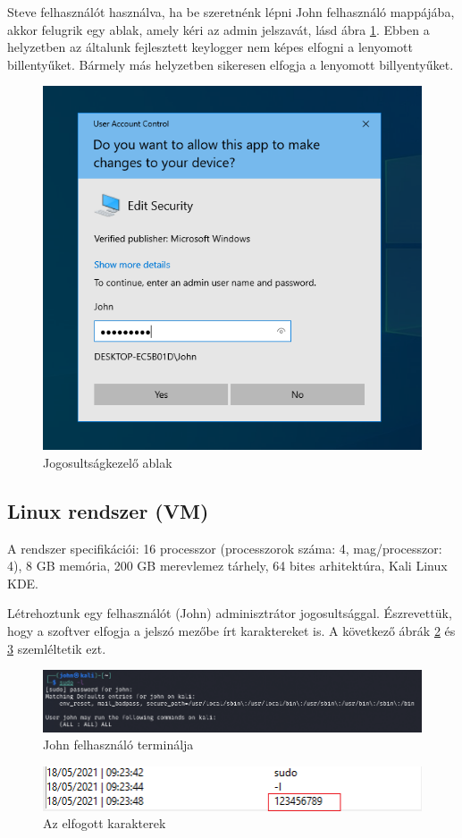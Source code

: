 \documentclass[12pt,a4paper,oneside]{report}
\begin{document}
Steve felhasználót használva, ha be szeretnénk lépni John felhasználó mappájába, akkor felugrik egy ablak, amely kéri az admin jelszavát, lásd ábra \ref{fig:winVM1}. Ebben a helyzetben az  általunk fejlesztett keylogger nem képes elfogni a lenyomott billentyűket. Bármely más helyzetben sikeresen elfogja a lenyomott billyentyűket.
\begin{figure}[H]
\centering
\includegraphics{../images/windowsVM1}
\caption{Jogosultságkezelő ablak}
\label{fig:winVM1}
\end{figure}

\subsection{Linux rendszer (VM)}
A rendszer specifikációi: 16 processzor (processzorok száma: 4, mag/processzor: 4), 8 GB memória, 200 GB merevlemez tárhely, 64 bites arhitektúra, Kali Linux KDE.

Létrehoztunk egy felhasználót (John) adminisztrátor jogosultsággal. Észrevettük, hogy a szoftver elfogja a jelszó mezőbe írt karaktereket is. A következő ábrák \ref{fig:linuxVM2} és \ref{fig:linuxVM1} szemléltetik ezt.
\begin{figure}[H]
\centering
\includegraphics[width=450pt]{../images/linuxVM2}
\caption{John felhasználó terminálja}
\label{fig:linuxVM2}
\end{figure}
\begin{figure}[H]
\centering
\includegraphics[width=400pt]{../images/linuxVM1}
\caption{Az elfogott karakterek}
\label{fig:linuxVM1}
\end{figure}
\end{document}
